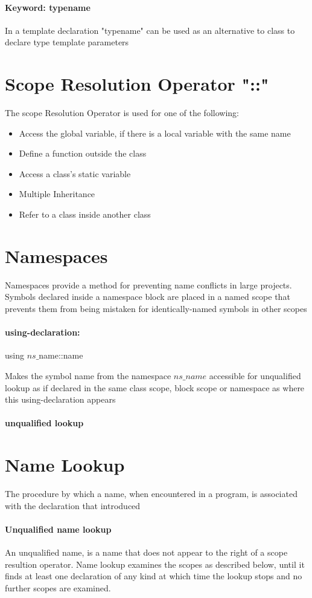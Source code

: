 \documentclass[8pt]{extreport}
\begin{document}
\paragraph{Keyword: typename} In a template declaration "typename" can be used as an alternative to class to declare type template parameters
\section{Scope Resolution Operator "::"}

The scope Resolution Operator is used for one of the following:

\begin{itemize}
\item Access the global variable, if there is a local variable with the same name
\item Define a function outside the class
\item Access a class's static variable
\item Multiple Inheritance
\item Refer to a class inside another class
\end{itemize}

\section{Namespaces}

Namespaces provide a method for preventing name conflicts in large projects. Symbols declared inside a namespace block are placed in a named scope that prevents them from being mistaken for identically-named symbols in other scopes

\paragraph{using-declaration:} 
\begin{center}
using $ns\_$name::name
\end{center}
Makes the symbol name from the namespace $ns\_name$ accessible for unqualified lookup as if declared in the same class scope, block scope or namespace as where this using-declaration appears

\paragraph{unqualified lookup}

\section{Name Lookup}

The procedure by which a name, when encountered  in a program, is associated with the declaration that introduced


\paragraph{Unqualified name lookup} An unqualified name, is a name that does not appear to the right of a scope resultion operator. Name lookup examines the scopes as described below, until it finds at least one declaration of any kind at which time the lookup stops and no further scopes are examined.\\
\end{document}
